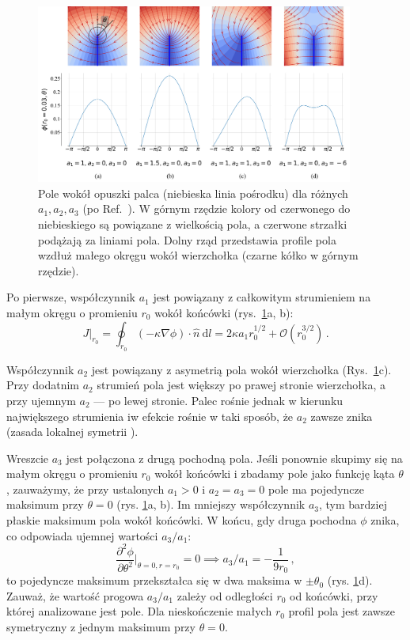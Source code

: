 \documentclass[]{pracamgr}
\begin{document}
    \begin{figure}[H]
      \centering
      \includegraphics[width=0.93\textwidth]{figs/grid_potential_python.png}
      \vspace{0pt}
      \caption {Pole wokół opuszki palca (niebieska linia pośrodku) dla różnych $a_1, a_2, a_3$ (po Ref.~\cite{petroff2013bifurcation}). W górnym rzędzie kolory od czerwonego do niebieskiego są powiązane z wielkością pola, a czerwone strzałki podążają za liniami pola. Dolny rząd przedstawia profile pola wzdłuż małego okręgu wokół wierzchołka (czarne kółko w górnym rzędzie).}
      \label{grid_pot}
    \end{figure}

    Po pierwsze, współczynnik $a_1$ jest powiązany z całkowitym strumieniem na małym okręgu o promieniu $r_0$ wokół końcówki (rys.~\ref{grid_pot}a, b):
    \begin{equation}\label{circle}
      J|_{r_0} = \oint_{r_0} (-\kappa \nabla \phi) \cdot \hat{n} \ \textrm{d}l = 2 \kappa a_1 r_0^{1/2} + \mathcal{O}\left(r_0^{3/2}\right) \,.
    \end{equation}

    Współczynnik $a_2$ jest powiązany z asymetrią pola wokół wierzchołka (Rys.~\ref{grid_pot}c). Przy dodatnim $a_2$ strumień pola jest większy po prawej stronie wierzchołka, a przy ujemnym $a_2$ — po lewej stronie. Palec rośnie jednak w kierunku największego strumienia iw efekcie rośnie w taki sposób, że $a_2$ zawsze znika (zasada lokalnej symetrii \cite{cohen2015path}).
    
    Wreszcie $a_3$ jest połączona z drugą pochodną pola. Jeśli ponownie skupimy się na małym okręgu o promieniu $r_0$ wokół końcówki i zbadamy pole jako funkcję kąta $\theta$, zauważymy, że przy ustalonych $a_1>0$ i $a_2=a_3=0$ pole ma pojedyncze maksimum przy $\theta = 0$ (rys. \ref{grid_pot}a, b). Im mniejszy współczynnik $a_3$, tym bardziej płaskie maksimum pola wokół końcówki. W końcu, gdy druga pochodna $\phi$ znika, co odpowiada ujemnej wartości $a_3/a_1$:
    \begin{equation}\label{a3a1}
      \frac{\partial^2 \phi}{\partial \theta^2}\big|_{\theta=0, r=r_0} = 0 \implies a_3/a_1 = -\frac{1}{9 r_0} \,, 
    \end{equation}
    to pojedyncze maksimum przekształca się w dwa maksima w $\pm \theta_0$ (rys. \ref{grid_pot}d). Zauważ, że wartość progowa $a_3/a_1$ zależy od odległości $r_0$ od końcówki, przy której analizowane jest pole. Dla nieskończenie małych $r_0$ profil pola jest zawsze symetryczny z jednym maksimum przy $\theta=0$.
\end{document}
